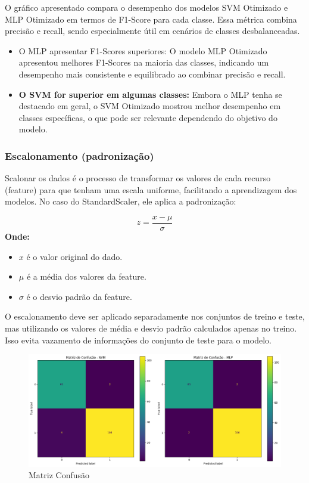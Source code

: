 \documentclass[12pt,a4paper,oneside,openany]{article}
\begin{document}
\noindent
O gráfico apresentado compara o desempenho dos modelos SVM Otimizado e MLP Otimizado em termos de F1-Score para cada classe. Essa métrica combina precisão e recall, sendo especialmente útil em cenários de classes desbalanceadas.
\noindent
\begin{itemize}
    \item O MLP apresentar F1-Scores superiores: O modelo MLP Otimizado apresentou melhores F1-Scores na maioria das classes, indicando um desempenho mais consistente e equilibrado ao combinar precisão e recall.
    \item \textbf{O SVM for superior em algumas classes:} Embora o MLP tenha se destacado em geral, o SVM Otimizado mostrou melhor desempenho em classes específicas, o que pode ser relevante dependendo do objetivo do modelo.
\end{itemize}

\subsubsection{ Escalonamento (padronização)}
\noindent
Scalonar os dados é o processo de transformar os valores de cada recurso (feature) para que tenham uma escala uniforme, facilitando a aprendizagem dos modelos. No caso do StandardScaler, ele aplica a padronização:

\[
z = \frac{x - \mu}{\sigma}
\]
\noindent
\textbf{Onde:}
\begin{itemize}
    \item $x$ é o valor original do dado.
    \item $\mu$ é a média dos valores da feature.
    \item $\sigma$ é o desvio padrão da feature.
\end{itemize}


\noindent
O escalonamento deve ser aplicado separadamente nos conjuntos de treino e teste, mas utilizando os valores de média e desvio padrão calculados apenas no treino. Isso evita vazamento de informações do conjunto de teste para o modelo.

\noindent
\begin{figure}[H]
    \centering
    \includegraphics[width=0.8\linewidth]{graficos/matrix_escalar_dados.png}
    \caption{Matriz Confusão}
    \label{fig:Matriz Confusão}
\end{figure}
\end{document}
